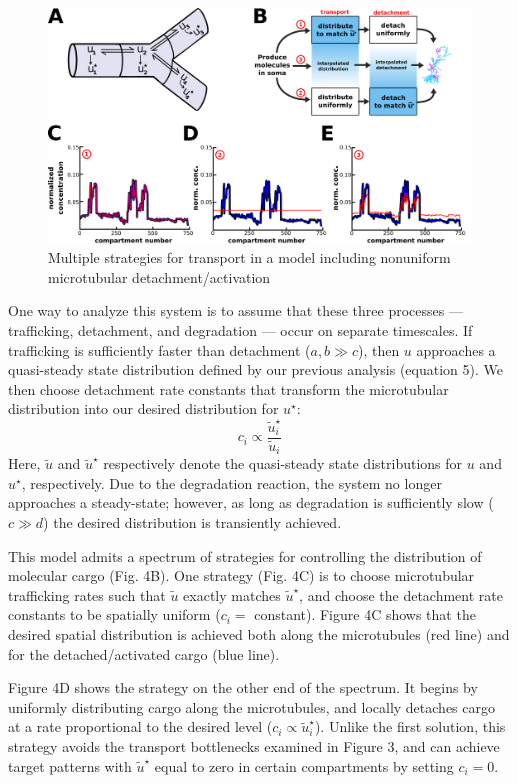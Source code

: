 \documentclass[10pt]{wlpeerj}
\begin{document}
\begin{figure}[!htbp]
\begin{center}
\includegraphics[width=0.9\columnwidth]{04_sushi_belt.png}
\caption{Multiple strategies for transport in a model including nonuniform microtubular detachment/activation}
\end{center}
\end{figure}

One way to analyze this system is to assume that these three processes --- trafficking, detachment, and degradation --- occur on separate timescales.
If trafficking is sufficiently faster than detachment ($a,b \gg c$), then $u$ approaches a quasi-steady state distribution defined by our previous analysis (equation 5).
We then choose detachment rate constants that transform the microtubular distribution into our desired distribution for $u^\star$:
\begin{equation}
c_i \propto \frac{\tilde{u}^\star_i}{\tilde{u}_i}
\end{equation}
Here, $\tilde{u}$ and $\tilde{u}^\star$ respectively denote the quasi-steady state distributions for $u$ and $u^\star$, respectively.
Due to the degradation reaction, the system no longer approaches a steady-state; however, as long as degradation is sufficiently slow ($c \gg d$) the desired distribution is transiently achieved.

This model admits a spectrum of strategies for controlling the distribution of molecular cargo (Fig. 4B).
One strategy (Fig. 4C) is to choose microtubular trafficking rates such that $\tilde{u}$ exactly matches $\tilde{u}^\star$, and choose the detachment rate constants to be spatially uniform ($c_i =$ constant).
Figure 4C shows that the desired spatial distribution is achieved both along the microtubules (red line) and for the detached/activated cargo (blue line).

Figure 4D shows the strategy on the other end of the spectrum.
It begins by uniformly distributing cargo along the microtubules, and locally detaches cargo at a rate proportional to the desired level ($c_i \propto \tilde{u}^\star_i$).
Unlike the first solution, this strategy avoids the transport bottlenecks examined in Figure 3, and can achieve target patterns with  $\tilde{u}^\star$ equal to zero in certain compartments by setting $c_i = 0$. 
\end{document}
